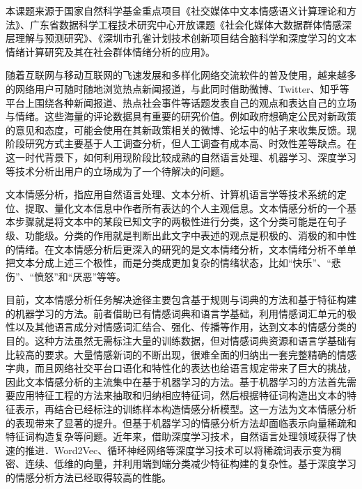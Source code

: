 


本课题来源于国家自然科学基金重点项目《社交媒体中文本情感语义计算理论和方法》、广东省数据科学工程技术研究中心开放课题《社会化媒体大数据群体情感深层理解与预测研究》、《深圳市孔雀计划技术创新项目结合脑科学和深度学习的文本情绪计算研究及其在社会群体情绪分析的应用》。



随着互联网与移动互联网的飞速发展和多样化网络交流软件的普及使用，越来越多的网络用户可随时随地浏览热点新闻报道，与此同时借助微博、Twitter、知乎等平台上围绕各种新闻报道、热点社会事件等话题发表自己的观点和表达自己的立场与情绪。这些海量的评论数据具有重要的研究价值。例如政府想确定公民对新政策的意见和态度，可能会使用在其新政策相关的微博、论坛中的帖子来收集反馈。现阶段研究方式主要基于人工调查分析，但人工调查有成本高、时效性差等缺点。在这一时代背景下，如何利用现阶段比较成熟的自然语言处理、机器学习、深度学习等技术分析出用户的立场成为了一个待解决的问题。

文本情感分析，指应用自然语言处理、文本分析、计算机语言学等技术系统的定位、提取、量化文本信息中作者所有表达的个人主观信息。文本情感分析的一个基本步骤就是将文本中的某段已知文字的两极性进行分类，这个分类可能是在句子级、功能级。分类的作用就是判断出此文字中表述的观点是积极的、消极的和中性的情绪。在文本情感分析后更深入的研究的是文本情绪分析，文本情绪分析不单单把文本分成上述三个极性，而是分类成更加复杂的情绪状态，比如“快乐”、“悲伤”、“愤怒”和“厌恶”等等。

目前，文本情感分析任务解决途径主要包含基于规则与词典的方法和基于特征构建的机器学习的方法。前者借助已有情感词典和语言学基础，利用情感词汇单元的极性以及其他语言成分对情感词汇结合、强化、传播等作用，达到文本的情感分类的目的。这种方法虽然无需标注大量的训练数据，但对情感词典资源和语言学基础有比较高的要求。大量情感新词的不断出现，很难全面的归纳出一套完整精确的情感字典，而且网络社交平台口语化和特性化的表达也给语言规定带来了巨大的挑战，因此文本情感分析的主流集中在基于机器学习的方法。基于机器学习的方法首先需要应用特征工程的方法来抽取和归纳相应特征词，然后根据特征词构造出文本的特征表示，再结合已经标注的训练样本构造情感分析模型。这一方法为文本情感分析的表现带来了显著的提升。但基于机器学习的情感分析方法却面临表示向量稀疏和特征词构造复杂等问题。近年来，借助深度学习技术，自然语言处理领域获得了快速的推进．Word2Vec、循环神经网络等深度学习技术可以将稀疏词表示变为稠密、连续、低维的向量，并利用端到端分类减少特征构建的复杂性。基于深度学习的情感分析方法已经取得较高的性能。

